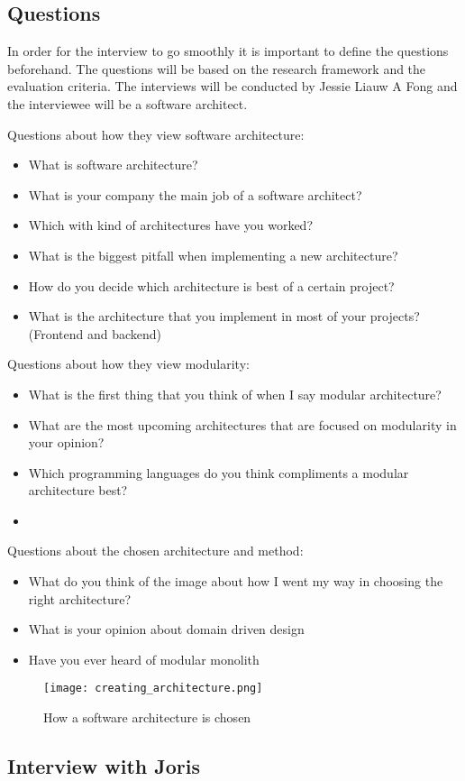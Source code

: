 \subsection{Questions}

In order for the interview to go smoothly it is important to define the questions beforehand. The questions will be based on the research framework and the evaluation criteria. The interviews will be conducted by Jessie Liauw A Fong and the interviewee will be a software architect.

Questions about how they view software architecture:
\begin{itemize}
  \item What is software architecture?
  \item What is your company the main job of a software architect?
  \item Which with kind of architectures have you worked?
  \item What is the biggest pitfall when implementing a new architecture?
  \item How do you decide which architecture is best of a certain project?
  \item What is the architecture that you implement in most of your projects? (Frontend and backend)
\end{itemize}

Questions about how they view modularity:
\begin{itemize}
  \item What is the first thing that you think of when I say modular architecture?
  \item What are the most upcoming architectures that are focused on modularity in your opinion?
  \item Which programming languages do you think compliments a modular architecture best?
  \item
\end{itemize}

Questions about the chosen architecture and method:
\begin{itemize}
  \item What do you think of the image about how I went my way in choosing the right architecture?
  \item What is your opinion about domain driven design
  \item Have you ever heard of modular monolith
\end{itemize}

\begin{figure}[H]
	\texttt{[image: creating\_architecture.png]}
	\caption{How a software architecture is chosen}
\end{figure}

\subsection{Interview with Joris}

